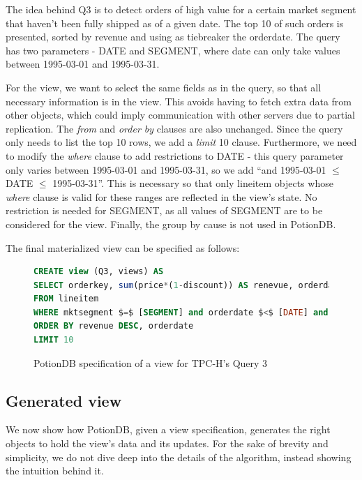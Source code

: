 \documentclass[sigplan,10pt]{acmart}
\begin{document}
The idea behind Q3 is to detect orders of high value for a certain market segment that haven't been fully shipped as of a given date.
The top 10 of such orders is presented, sorted by revenue and using as tiebreaker the orderdate.
The query has two parameters - DATE and SEGMENT, where date can only take values between 1995-03-01 and 1995-03-31.

For the view, we want to select the same fields as in the query, so that all necessary information is in the view.
This avoids having to fetch extra data from other objects, which could imply communication with other servers due to partial replication.
The \emph{from} and \emph{order by} clauses are also unchanged. %
Since the query only needs to list the top 10 rows, we add a \emph{limit} 10 clause.
Furthermore, we need to modify the \emph{where} clause to add restrictions to DATE - this query parameter only varies between 1995-03-01 and 1995-03-31, so we add ``and 1995-03-01 $\leq$ DATE $\leq$ 1995-03-31''.
This is necessary so that only lineitem objects whose \emph{where} clause is valid for these ranges are reflected in the view's state.
No restriction is needed for SEGMENT, as all values of SEGMENT are to be considered for the view.
Finally, the group by cause is not used in PotionDB.

The final materialized view can be specified as follows:

\begin{figure}[h]
	\begin{lstlisting}[language=SQL]
CREATE view (Q3, views) AS
SELECT orderkey, sum(price*(1-discount)) AS renevue, orderdate, shippriority
FROM lineitem
WHERE mktsegment $=$ [SEGMENT] and orderdate $<$ [DATE] and shipdate $>$ [DATE] and 1995-03-01 $\leq$ DATE $\leq$ 1995-03-31
ORDER BY revenue DESC, orderdate
LIMIT 10
	\end{lstlisting}
\caption{PotionDB specification of a view for TPC-H's Query 3}
\label{fig:q3_view}
\end{figure}

\subsection{Generated view}
\label{subsec:generated_view}

We now show how PotionDB, given a view specification, generates the right objects to hold the view's data and its updates.
For the sake of brevity and simplicity, we do not dive deep into the details of the algorithm, instead showing the intuition behind it.
\end{document}
